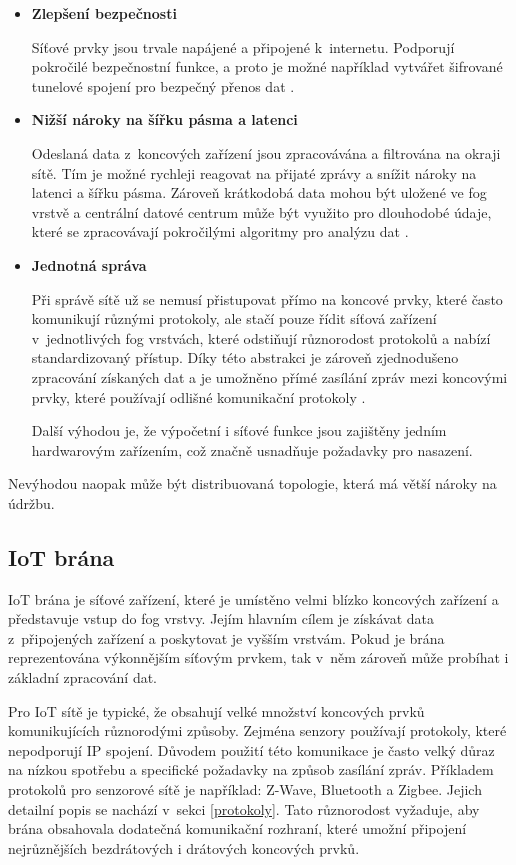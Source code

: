  \begin{itemize}
 \item \textbf{Zlepšení bezpečnosti} 
 
     Síťové prvky jsou trvale napájené a připojené k internetu. Podporují pokročilé
     bezpečnostní funkce, a proto je možné například vytvářet šifrované tunelové
     spojení pro bezpečný přenos dat \cite{fog}.     
\item \textbf{Nižší nároky na šířku pásma a latenci} 

    Odeslaná data z~koncových zařízení jsou zpracovávána a filtrována na okraji 
    sítě. Tím je možné rychleji reagovat na přijaté zprávy a snížit nároky
    na latenci a šířku pásma. Zároveň krátkodobá data mohou být uložené ve 
    fog vrstvě a centrální datové centrum může být využito pro dlouhodobé údaje, 
    které se zpracovávají pokročilými algoritmy pro analýzu dat \cite{fog}.
 \item \textbf{Jednotná správa} 
 
    Při správě sítě už se nemusí přistupovat přímo na koncové prvky, které 
    často komunikují různými protokoly, ale stačí pouze
    řídit síťová zařízení v~jednotlivých fog vrstvách, které odstiňují různorodost
    protokolů a nabízí standardizovaný přístup. Díky této abstrakci je 
    zároveň zjednodušeno zpracování získaných dat a je umožněno přímé zasílání zpráv
    mezi koncovými prvky, které používají odlišné komunikační protokoly \cite{fog}.
    
    Další výhodou je, že výpočetní i síťové funkce jsou zajištěny jedním hardwarovým
    zařízením, což značně usnadňuje požadavky pro nasazení.
 \end{itemize} 
 
 Nevýhodou naopak může být distribuovaná topologie, která má větší nároky na údržbu.
 
 \subsection{IoT brána} 
 IoT brána je síťové zařízení, které je umístěno velmi blízko koncových zařízení
 a představuje vstup do fog vrstvy. Jejím hlavním cílem je získávat data 
 z~připojených zařízení a poskytovat je vyšším vrstvám. Pokud je brána reprezentována
 výkonnějším síťovým prvkem, tak v~něm zároveň může probíhat i základní zpracování
 dat. 
 
 Pro IoT sítě je typické, že obsahují velké množství koncových prvků komunikujících
 různorodými způsoby. Zejména senzory používají protokoly, které nepodporují
 IP spojení. Důvodem použití této komunikace je často velký
 důraz na nízkou spotřebu a specifické požadavky na způsob zasílání zpráv.
 Příkladem protokolů pro senzorové sítě je například:
 Z-Wave, Bluetooth a Zigbee. Jejich detailní popis se nachází v~sekci 
 \ref{protokoly}.
 Tato různorodost vyžaduje, aby brána obsahovala dodatečná komunikační rozhraní, které 
 umožní připojení nejrůznějších bezdrátových i drátových koncových prvků. 
 
